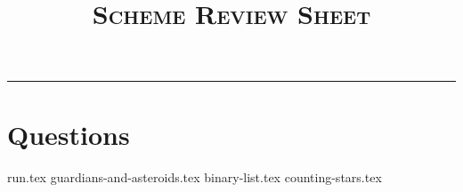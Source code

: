 \documentclass{exam}
\title{\textsc{Scheme Review Sheet}}
\begin{document}
\maketitle
\rule{\textwidth}{0.15em}
\fontsize{12}{15}\selectfont

\section{Questions}
\begin{questions}
{run.tex}
\newpage
{guardians-and-asteroids.tex}
\newpage
{binary-list.tex}
\newpage
{counting-stars.tex}

\end{questions}
\end{document}
